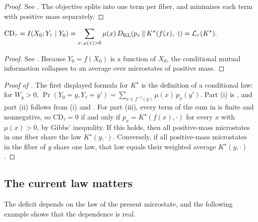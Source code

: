 \begin{proof}
See . The objective splits into one term per fiber, and  minimizes each term with positive mass separately.
\end{proof}

\begin{lemma}\label{lem:closure_cmi_identity}
$\displaystyle \mathrm{CD}_\tau=I(X_0;Y_\tau\mid Y_0)=\sum_{x:\,\mu(x)>0}\mu(x)\,D_{\mathrm{KL}}\!\left(p_x\,\middle\|\,K^\star(f(x),\cdot)\right)=\mathcal{L}_\tau(K^\star).$
\end{lemma}

\begin{proof}
See . Because $Y_0=f(X_0)$ is a function of $X_0$, the conditional mutual information collapses to an average over microstates of positive mass.
\end{proof}

\begin{proof}[Proof of ]
The first displayed formula for $K^\star$ is the definition of a conditional law: for $W_y>0$,
$\Pr(Y_0=y,Y_\tau=y')=\sum_{x\in f^{-1}(y)}\mu(x)\,p_x(y')$.
Part (i) is , and part (ii) follows from (i) and .
For part (iii), every term of the sum in  is finite and nonnegative, so $\mathrm{CD}_\tau=0$ if and only if $p_x=K^\star(f(x),\cdot)$ for every $x$ with $\mu(x)>0$, by Gibbs' inequality.
If this holds, then all positive-mass microstates in one fiber share the law $K^\star(y,\cdot)$.
Conversely, if all positive-mass microstates in the fiber of $y$ share one law, that law equals their weighted average $K^\star(y,\cdot)$.
\end{proof}

\subsection{The current law matters}

The deficit depends on the law of the present microstate, and the following example shows that the dependence is real.

